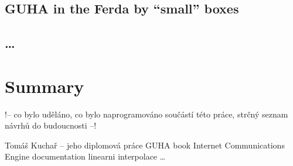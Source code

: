 \documentclass[a4paper,12pt]{book}
\begin{document}
\section{GUHA in the Ferda by ``small'' boxes}

\section{\dots}
\chapter{Summary}
!-- co bylo uděláno, co bylo naprogramováno součástí této práce, strčný seznam návrhů do budoucnosti --!



\begin{thebibliography}{thesisKuchar}
 Tomáš Kuchař -- jeho diplomová práce
 GUHA book
 Internet Communications Engine documentation
 linearni interpolace 
 \dots
\end{thebibliography}
\end{document}
